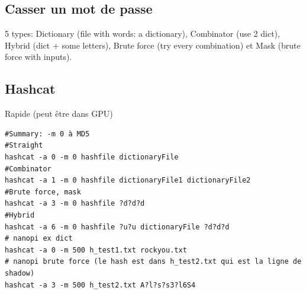 \subsection{Casser un mot de passe}
5 types: Dictionary (file with words: a dictionary), Combinator (use 2 dict), Hybrid (dict + some letters), Brute force (try every combination) et Mask (brute force with inputs).

\subsection{Hashcat}
Rapide (peut être dans GPU)
\begin{Verbatim}[breaklines=true, breakanywhere=true]
#Summary: -m 0 à MD5
#Straight
hashcat -a 0 -m 0 hashfile dictionaryFile
#Combinator
hashcat -a 1 -m 0 hashfile dictionaryFile1 dictionaryFile2
#Brute force, mask
hashcat -a 3 -m 0 hashfile ?d?d?d
#Hybrid
hashcat -a 6 -m 0 hashfile ?u?u dictionaryFile ?d?d?d
# nanopi ex dict
hashcat -a 0 -m 500 h_test1.txt rockyou.txt
# nanopi brute force (le hash est dans h_test2.txt qui est la ligne de shadow)
hashcat -a 3 -m 500 h_test2.txt A?l?s?s3?l6S4
\end{Verbatim}
